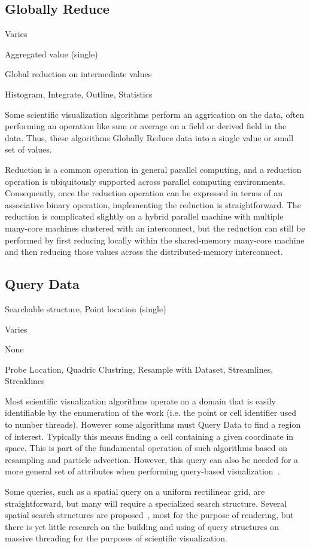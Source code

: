 \documentclass{sig-alternate}
\newcommand*{\lcite}[1]{~\cite{#1}}
\newcommand{\algclass}[1]{\textsf{#1}}
\newcommand{\algorithmclasssection}[1]{\subsection*{#1}}
\newcommand{\algorithmclass}[5]{
  \algorithmclasssection{#1} %
  \begin{description}[leftmargin=9em,style=nextline,noitemsep]
    \raggedright
  \item[Input] #2
  \item[Output] #3
  \item[Interdependence] #4
  \item[Algorithms] #5
  \end{description}
}
\begin{document}
\algorithmclass{Globally Reduce}
               {Varies} %
               {Aggregated value (single)} %
               {Global reduction on intermediate values} %
               {Histogram, Integrate, Outline, Statistics}

\noindent
Some scientific visualization algorithms perform an aggrication on the
data, often performing an operation like sum or average on a field or
derived field in the data. Thus, these algorithms \algclass{Globally
  Reduce} data into a single value or small set of values.

Reduction is a common operation in general parallel computing, and a
reduction operation is ubiquitously supported across parallel computing
environments. Consequently, once the reduction operation can be expressed
in terms of an associative binary operation, implementing the reduction is
straightforward. The reduction is complicated slightly on a hybrid parallel
machine with multiple many-core machines clustered with an interconnect,
but the reduction can still be performed by first reducing locally within
the shared-memory many-core machine and then reducing those values across
the distributed-memory interconnect.


\algorithmclass{Query Data}
               {Searchable structure, Point location (single)} %
               {Varies} %
               {None} %
               {Probe Location, Quadric Clustring, Resample with Dataset,
                 Streamlines, Streaklines}

\noindent
Most scientific visualization algorithms operate on a domain that is easily
identifiable by the enumeration of the work (i.e. the point or cell
identifier used to number threads). However some algorithms must
\algclass{Query Data} to find a region of interest. Typically this means
finding a cell containing a given coordinate in space. This is part of the
fundamental operation of such algorithms based on resampling and particle
advection. However, this query can also be needed for a more general set of
attributes when performing query-based
visualization\lcite{Glatter2008,Gosink2008,Johnson2009,Rubel2008}.

Some queries, such as a spatial query on a uniform rectilinear grid, are
straightforward, but many will require a specialized search
structure. Several spatial search structures are
proposed\lcite{Foley2005,Kalojanov2009,Kalojanov2011,Zhou2008,Zhou2010},
most for the purpose of rendering, but there is yet little research on the
building and using of query structures on massive threading for the
purposes of scientific visualization.
\end{document}
